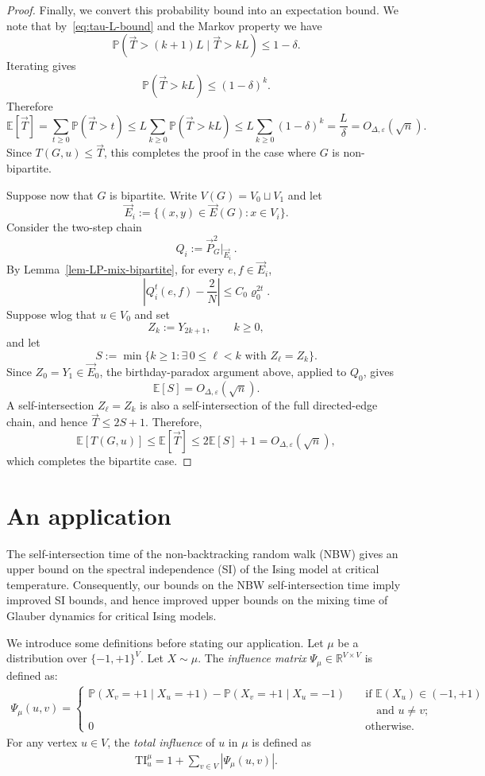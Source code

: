 \documentclass[11pt,a4paper]{article}
\theoremstyle{plain}
\let\rho=\varrho
\renewcommand{\Pr}{\mathbb{P}}
\begin{document}
\begin{proof}
Finally, we convert this probability bound into an expectation bound. We note that by~\eqref{eq:tau-L-bound} and the Markov property we have
\[
\mathbb P(\vec{T}>(k+1)L\mid \vec{T}>kL)\le 1-\delta.
\]
Iterating gives
\[
\mathbb P(\vec{T}>kL)\le (1-\delta)^k.
\]
Therefore
\[
\mathbb E[\vec{T}]
=
\sum_{t\ge 0}\mathbb P(\vec{T}>t)
\le
L\sum_{k\ge 0}\mathbb P(\vec{T}>kL)
\le
L\sum_{k\ge 0}(1-\delta)^k
=
\frac{L}{\delta}
=
O_{\Delta,\varepsilon}(\sqrt n).
\]
Since \(T(G,u)\le \vec{T}\), this completes the proof in the case where $G$ is non-bipartite.

Suppose now that $G$ is bipartite. Write
$
V(G)=V_0\sqcup V_1
$
and let
\[
\vec E_i:=\{(x,y)\in\vec E(G):x\in V_i\}.
\]
Consider the two-step chain
\[
Q_i:=\vec P_G^2\big|_{\vec E_i}\, .
\]
By Lemma~\ref{lem-LP-mix-bipartite}, for every $e,f\in\vec E_i$,
\[
\left|
Q_i^t(e,f)-\frac2N
\right|
\le
C_0\rho_0^{2t}.
\]
Suppose wlog that $u\in V_0$ and set
\[
Z_k:=Y_{2k+1},
\qquad k\ge0,
\]
and let
\[
S:=\min\{k\ge1:\exists\,0\le\ell<k\text{ with }Z_\ell=Z_k\}.
\]
Since $Z_0=Y_1\in\vec E_0$, the birthday-paradox argument above,
applied to $Q_0$, gives
\[
\mathbb E[S]
=
O_{\Delta,\varepsilon}(\sqrt n).
\]
A self-intersection $Z_\ell=Z_k$ is also a self-intersection of the
full directed-edge chain, and hence
$
\vec T\le2S+1.
$
Therefore,
\[
\mathbb E[T(G,u)]
\le
\mathbb E[\vec T]
\le
2\mathbb E[S]+1
=
O_{\Delta,\varepsilon}(\sqrt n),
\]
which completes the bipartite case.

\end{proof}

\section{An application}\label{sec:appli}
The self-intersection time of the non-backtracking random walk (NBW) gives an upper bound on the spectral independence (SI) of the Ising model at critical temperature. 
Consequently, our bounds on the NBW self-intersection time imply improved SI bounds, and hence improved upper bounds on the mixing time of Glauber dynamics for critical Ising models. 

We introduce some definitions before stating our application.
Let $\mu$ be a distribution over $\{-1,+1\}^V$. 
Let $X \sim \mu$. The \emph{influence matrix} $\Psi_{\mu}\in\mathbb{R}^{V\times V}$ is defined as: 
\begin{align*}
\Psi_{\mu}(u,v)=\begin{cases}
\Pr(X_v=+1\mid X_u=+1)-\Pr(X_v=+1\mid X_u=-1) &\quad \text{if }\mathbb{E}(X_u)\in(-1,+1)\\
&\qquad \text{and }u\ne v;\\
0 &\quad \text{otherwise}.
\end{cases}
\end{align*}
For any vertex $u \in V$, the \emph{total influence} of $u$ in $\mu$ is defined as
\begin{align*}
\mathrm{TI}^{\mu}_{u} = 1+\sum_{v\in V}|\Psi_{\mu}(u,v)|.
\end{align*}
\end{document}
